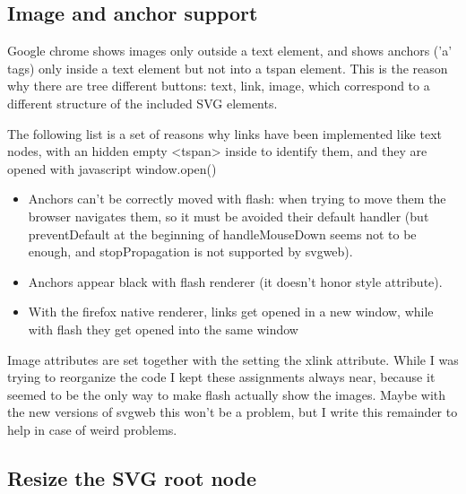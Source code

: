 \documentclass[10pt,a4paper,english]{book}
\begin{document}

\hypertarget{image-and-anchor-support}{}
\subsection{Image and anchor support}
\label{image-and-anchor-support}

Google chrome shows images only outside a text element, and shows
anchors ('a' tags) only inside a text element but not into a tspan
element. This is the reason why there are tree different buttons:
text, link, image, which correspond to a different structure of the
included SVG elements.

The following list is a set of reasons why links have been implemented
like text nodes, with an hidden empty {\textless}tspan{\textgreater} inside to identify them,
and they are opened with javascript window.open()
\begin{itemize}
\item {} 
Anchors can't be correctly moved with flash: when trying to move
them the browser navigates them, so it must be avoided their default
handler (but preventDefault at the beginning of handleMouseDown
seems not to be enough, and stopPropagation is not supported by
svgweb).

\item {} 
Anchors appear black with flash renderer (it doesn't honor style
attribute).

\item {} 
With the firefox native renderer, links get opened in a new window,
while with flash they get opened into the same window

\end{itemize}

Image attributes are set together with the setting the xlink
attribute. While I was trying to reorganize the code I kept these
assignments always near, because it seemed to be the only way to make
flash actually show the images. Maybe with the new versions of svgweb
this won't be a problem, but I write this remainder to help in case of
weird problems.



\hypertarget{resize-the-svg-root-node}{}
\subsection{Resize the SVG root node}
\label{resize-the-svg-root-node}
\end{document}
